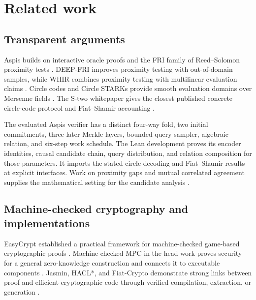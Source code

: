 \section{Related work}
\label{sec:related-work}

\subsection{Transparent arguments}

Aspis builds on interactive oracle proofs and the FRI family of
Reed--Solomon proximity tests
\cite{BenSassonChiesaSpooner2016,
BenSassonBentovHoreshRiabzev2018FRI,
BenSassonBentovHoreshRiabzev2018STARK}.  DEEP-FRI improves proximity testing
with out-of-domain samples, while WHIR combines proximity testing with
multilinear evaluation claims
\cite{BenSassonGoldbergKoppartySaraf2020,
ArnonChiesaFenziYogev2025WHIR}.  Circle codes and Circle STARKs provide smooth
evaluation domains over Mersenne fields
\cite{HaboeckLubarovNabaglo2023,HaboeckLevitPapini2024}.  The S-two
whitepaper gives the closest published concrete circle-code protocol and
Fiat--Shamir accounting \cite{CarmonEtAl2026Stwo}.

The evaluated Aspis verifier has a distinct four-way fold, two initial
commitments, three later Merkle layers, bounded query sampler, algebraic
relation, and six-step work schedule.  The Lean development proves its
encoder identities, causal candidate chain, query distribution, and relation
composition for those parameters.  It imports the stated circle-decoding and
Fiat--Shamir results at explicit interfaces.  Work on proximity gaps and
mutual correlated agreement supplies the mathematical setting for the
candidate analysis
\cite{BenSassonCarmonIshaiKoppartySaraf2023,
BordageChiesaGuanManzur2025,Haboeck2025MCA,CritesStewart2025}.

\subsection{Machine-checked cryptography and implementations}

EasyCrypt established a practical framework for machine-checked game-based
cryptographic proofs \cite{BartheEtAl2012EasyCrypt}.  Machine-checked
MPC-in-the-head work proves security for a general zero-knowledge construction
and connects it to executable components
\cite{AlmeidaEtAl2021MitH}.  Jasmin, HACL*, and Fiat-Crypto demonstrate
strong links between proof and efficient cryptographic code through verified
compilation, extraction, or generation
\cite{AlmeidaEtAl2017Jasmin,ZinzindohoueEtAl2017HACL,
ErbsenEtAl2019FiatCrypto}.

